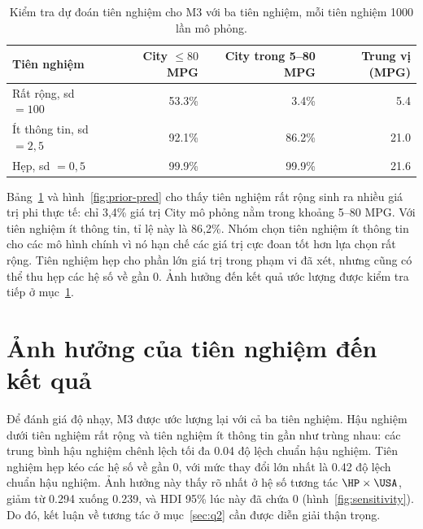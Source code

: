 \documentclass[12pt,a4paper]{report}
\begin{document}
\begin{table}[tp]
  \centering
  \caption{Kiểm tra dự đoán tiên nghiệm cho M3 với ba tiên nghiệm, mỗi tiên
    nghiệm \num{1000} lần mô phỏng.}
  \label{tab:prior-pred}
  \begin{tabular}{lrrr}
    \toprule
    Tiên nghiệm & City $\le 80$ MPG & City trong 5--80 MPG & Trung vị (MPG) \\
    \midrule
    Rất rộng, sd $= 100$     & \num{53.3}\% & \num{3.4}\%  & \num{5.4} \\
    Ít thông tin, sd $= 2{,}5$ & \num{92.1}\% & \num{86.2}\% & \num{21.0} \\
    Hẹp, sd $= 0{,}5$       & \num{99.9}\% & \num{99.9}\% & \num{21.6} \\
    \bottomrule
  \end{tabular}
\end{table}

Bảng~\ref{tab:prior-pred} và hình~\ref{fig:prior-pred} cho thấy tiên nghiệm
rất rộng sinh ra nhiều giá trị phi thực tế: chỉ 3{,}4\% giá trị City mô phỏng
nằm trong khoảng 5--80 MPG. Với tiên nghiệm ít thông tin, tỉ lệ này là 86{,}2\%.
Nhóm chọn tiên nghiệm ít thông tin cho các mô hình chính vì nó hạn chế các giá
trị cực đoan tốt hơn lựa chọn rất rộng. Tiên nghiệm hẹp cho phần lớn giá trị
trong phạm vi đã xét, nhưng cũng có thể thu hẹp các hệ số về gần 0. Ảnh hưởng
đến kết quả ước lượng được kiểm tra tiếp ở mục~\ref{sec:sensitivity}.


\section{Ảnh hưởng của tiên nghiệm đến kết quả}
\label{sec:sensitivity}

Để đánh giá độ nhạy, M3 được ước lượng lại với cả ba tiên nghiệm. Hậu nghiệm
dưới tiên nghiệm rất rộng và tiên nghiệm ít thông tin gần như trùng nhau: các
trung bình hậu nghiệm chênh lệch tối đa \num{0.04} độ lệch chuẩn hậu nghiệm.
Tiên nghiệm hẹp kéo
các hệ số về gần 0, với mức thay đổi lớn nhất là
\num{0.42} độ lệch chuẩn hậu nghiệm. Ảnh hưởng này thấy rõ nhất ở hệ số tương tác
$\HP \times \USA$, giảm từ \num{0.294} xuống \num{0.239}, và HDI 95\% lúc này đã
chứa 0 (hình~\ref{fig:sensitivity}). Do đó, kết luận về tương tác ở
mục~\ref{sec:q2} cần được diễn giải thận trọng.
\end{document}
